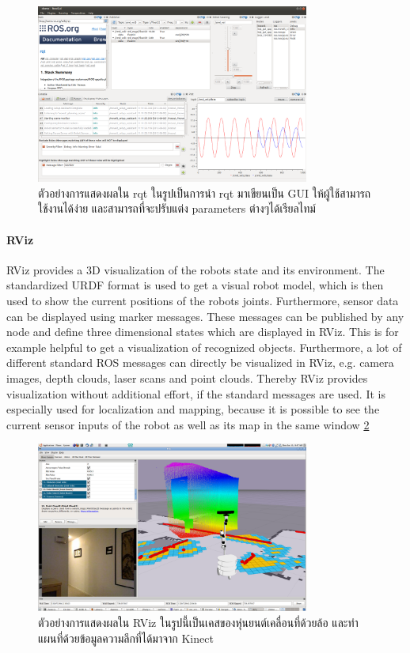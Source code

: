\begin{figure}[htbp]
    \centering
    \includegraphics[width=0.8\textwidth]{chapter2/images/ros_gui_example.png}
	\caption{ตัวอย่างการแสดงผลใน rqt ในรูปเป็นการนำ rqt มาเขียนเป็น GUI ให้ผู้ใช้สามารถใช้งานได้ง่าย
	และสามารถที่จะปรับแต่ง parameters ต่างๆได้เรียลไทม์}
    \label{fig:ros_gui_example}
\end{figure}

\paragraph*{RViz}
RViz  provides  a  3D  visualization  of  the  robots  state  and  its  environment.   The
standardized URDF format is used to get a visual robot model, which is then used
to  show  the  current  positions  of  the  robots  joints.   Furthermore,  sensor  data  can
be displayed using marker messages.  These messages can be published by any node
and define three dimensional states which are displayed in RViz.  This is for example
helpful to get a visualization of recognized objects.  Furthermore, a lot of different
standard  ROS  messages  can  directly  be  visualized  in  RViz,  e.g.   camera  images,
depth  clouds,  laser  scans  and  point  clouds.   Thereby  RViz  provides  visualization
without additional effort, if the standard messages are used.  It is especially used for
localization and mapping, because it is possible to see the current sensor inputs of
the robot as well as its map in the same window \ref{fig:example_visualization_rviz}

\begin{figure}[htbp]
    \centering
    \includegraphics[width=0.8\textwidth]{chapter2/images/nav_test_rviz_2.png}
	\caption{ตัวอย่างการแสดงผลใน RViz ในรูปนี้เป็นเคสของหุ่นยนต์เคลื่อนที่ด้วยล้อ และทำแผนที่ด้วยข้อมูลความลึกที่ได้มาจาก Kinect}
    \label{fig:example_visualization_rviz}
\end{figure}



